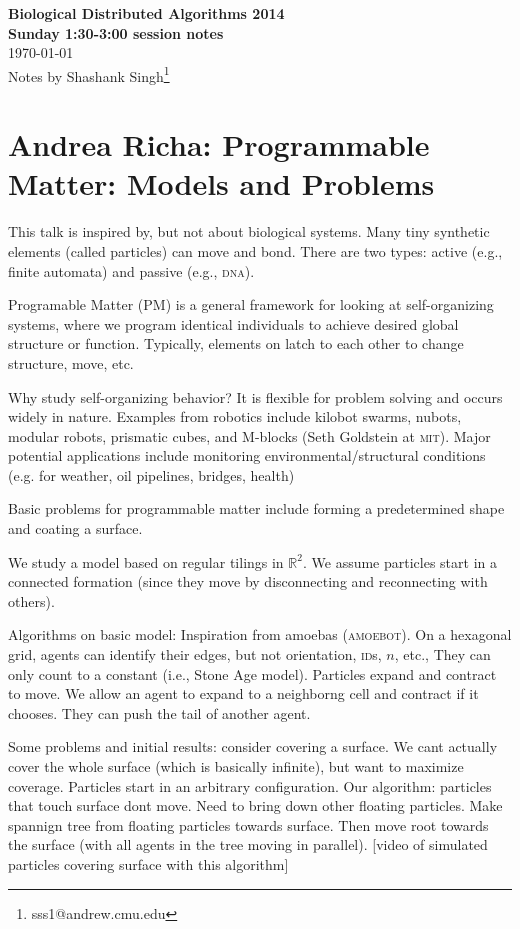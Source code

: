 \documentclass{article}
\newcommand{\R}{\mathbb{R}}                         %
\newcommand{\acro}[1]{\textsc{\MakeLowercase{#1}}}
\begin{document}
\begin{center}
{\bf\Large Biological Distributed Algorithms 2014\\
Sunday 1:30-3:00 session notes}\\
\today\\
Notes by Shashank Singh\footnote{sss1@andrew.cmu.edu}\\
\end{center}

\section{Andrea Richa: Programmable Matter: Models and Problems}
This talk is inspired by, but not about biological systems. Many tiny synthetic
elements (called particles) can move and bond. There are two types: active
(e.g., finite automata) and passive (e.g., \acro{DNA}).

Programable Matter (PM) is a general framework for looking at self-organizing
systems, where we program identical individuals to achieve desired global
structure or function. Typically, elements on latch to each other to change
structure, move, etc.

Why study self-organizing behavior? It is flexible for problem solving and
occurs widely in nature. Examples from robotics include kilobot swarms, nubots,
modular robots, prismatic cubes, and M-blocks (Seth Goldstein at \acro{MIT}).
Major potential applications include monitoring environmental/structural
conditions (e.g. for weather, oil pipelines, bridges, health)

Basic problems for programmable matter include forming a predetermined shape
and coating a surface.

We study a model based on regular tilings in $\R^2$. We assume particles start
in a connected formation (since they move by disconnecting and reconnecting
with others).

Algorithms on basic model:
Inspiration from amoebas (\acro{AMOEBOT}). On a hexagonal grid, agents can
identify their edges, but not orientation, \acro{ID}s, $n$, etc., They can only
count to a constant (i.e., Stone Age model). Particles expand and contract to
move. We allow an agent to expand to a neighborng cell and contract if it
chooses. They can push the tail of another agent.

Some problems and initial results: consider covering a surface. We cant
actually cover the whole surface (which is basically infinite), but want to
maximize coverage. Particles start in an arbitrary configuration. Our
algorithm: particles that touch surface dont move. Need to bring down other
floating particles. Make spannign tree from floating particles towards surface.
Then move root towards the surface (with all agents in the tree moving in
parallel). [video of simulated particles covering surface with this algorithm]
\end{document}
